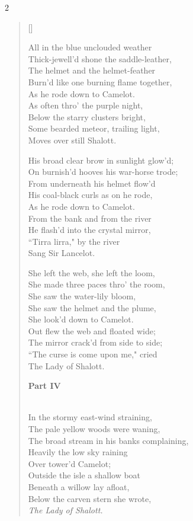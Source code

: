 \begin{paracol}{2}
\begin{verse}[\versewidth]
\begin{patverse}
All in the blue unclouded weather\\
Thick-jewell'd shone the saddle-leather,\\
The helmet and the helmet-feather\\
Burn'd like one burning flame together,\\
As he rode down to Camelot.\\
As often thro' the purple night,\\
Below the starry clusters bright,\\
Some bearded meteor, trailing light,\\
Moves over still Shalott.
\end{patverse}

\begin{patverse}
His broad clear brow in sunlight glow'd;\\
On burnish'd hooves his war-horse trode;\\
From underneath his helmet flow'd\\
His coal-black curls as on he rode,\\
As he rode down to Camelot.\\
From the bank and from the river\\
He flash'd into the crystal mirror,\\
``Tirra lirra," by the river\\
Sang Sir Lancelot.
\end{patverse}

\begin{patverse}
She left the web, she left the loom,\\
She made three paces thro' the room,\\
She saw the water-lily bloom,\\
She saw the helmet and the plume,\\
She look'd down to Camelot.\\
Out flew the web and floated wide;\\
The mirror crack'd from side to side;\\
``The curse is come upon me," cried\\
The Lady of Shalott.\end{patverse} \switchcolumn

\textbf{Part IV}
\begin{patverse}
\phantom{.}\\
In the stormy east-wind straining,\\
The pale yellow woods were waning,\\
The broad stream in his banks complaining,\\
Heavily the low sky raining\\
Over tower'd Camelot;\\
Outside the isle a shallow boat\\
Beneath a willow lay afloat,\\
Below the carven stern she wrote,\\
\emph{The Lady of Shalott.}
\end{patverse}


\end{verse}
\end{paracol}
